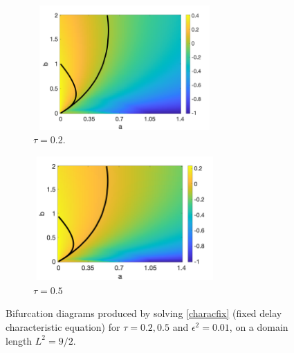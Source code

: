 \begin{figure}[H]
    \centering
    \begin{subfigure}[t]{0.45\textwidth}
        \centering
        \includegraphics[width=7cm,height=4.75cm]{distbif3.png}
        \caption{$\tau=0.2$.}
        \label{}
    \end{subfigure}
    \hfill
    \begin{subfigure}[t]{0.45\textwidth}
        \centering
        \includegraphics[width=7cm,height=4.75cm]{distbif4.png}
        \caption{$\tau=0.5$}
        \label{}
    \end{subfigure}
    \caption{Bifurcation diagrams produced by solving \eqref{characfix} (fixed delay characteristic equation) for $\tau=0.2,0.5$ and $\epsilon^2=0.01$, on a domain length $L^2=9/2$.}
    \label{fig:distheat2}
\end{figure}

